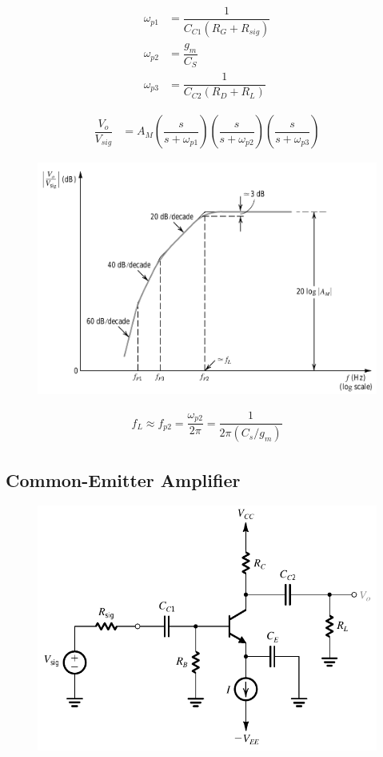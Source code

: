 \begin{equation*}
  \begin{aligned}
    \omega_{p1} &= \dfrac{1}{C_{C1} \left( R_G + R_{sig} \right)} \\
    \omega_{p2} &= \dfrac{g_m}{C_S} \\
    \omega_{p3} &= \dfrac{1}{C_{C2} \left( R_D + R_L \right)} 
  \end{aligned}
\end{equation*}

\begin{equation*}
  \begin{aligned}
    \dfrac{V_o}{V_{sig}} &= A_M \left( \dfrac{s}{s + \omega_{p1}}  \right) \left( \dfrac{s}{s + \omega_{p2}}  \right) \left( \dfrac{s}{s + \omega_{p3}}  \right) 
  \end{aligned}
\end{equation*}

\begin{figure}[H]
  \centering
  \includegraphics[width=0.6\linewidth]{figures/Frequency-Response-CS-freq}
  \label{fig:}
\end{figure}

\begin{equation*}
  \begin{aligned}
    f_L \approx f_{p2} = \dfrac{\omega_{p2}}{2 \pi} = \dfrac{1}{2 \pi \left( C_s / g_m  \right)} 
  \end{aligned}
\end{equation*}

\subsection{Common-Emitter Amplifier}

\begin{figure}[H]
  \centering
  \includegraphics[width=0.4\linewidth]{figures/Frequency-Response-CE}
  \label{fig:}
\end{figure}

